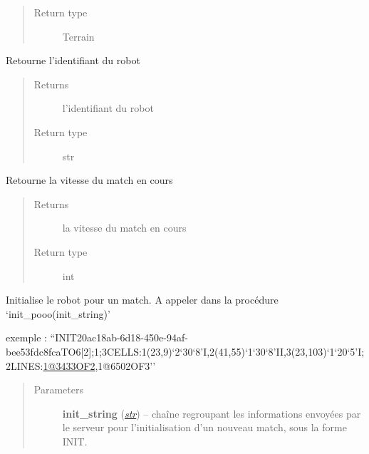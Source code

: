 \documentclass[letterpaper,10pt,english]{sphinxmanual}
\begin{document}
\begin{fulllineitems}
\begin{fulllineitems}
\begin{quote}
\begin{description}
\item[{Return type}] \leavevmode
Terrain

\end{description}\end{quote}

\end{fulllineitems}


\begin{fulllineitems}
\label{index:Robot.Robot.getUID}
Retourne l'identifiant du robot
\begin{quote}\begin{description}
\item[{Returns}] \leavevmode
l'identifiant du robot

\item[{Return type}] \leavevmode
str

\end{description}\end{quote}

\end{fulllineitems}


\begin{fulllineitems}
\label{index:Robot.Robot.getVitesse}
Retourne la vitesse du match en cours
\begin{quote}\begin{description}
\item[{Returns}] \leavevmode
la vitesse du match en cours

\item[{Return type}] \leavevmode
int

\end{description}\end{quote}

\end{fulllineitems}


\begin{fulllineitems}
\label{index:Robot.Robot.initialiserMatch}
Initialise le robot pour un match.
A appeler dans la procédure `init\_pooo(init\_string)'

exemple : ``INIT20ac18ab-6d18-450e-94af-bee53fdc8fcaTO6{[}2{]};1;3CELLS:1(23,9)`2`30`8'I,2(41,55)`1`30`8'II,3(23,103)`1`20`5'I;2LINES:\href{mailto:1@3433OF2}{1@3433OF2},1@6502OF3''
\begin{quote}\begin{description}
\item[{Parameters}] \leavevmode
\textbf{init\_string} (\href{http://docs.python.org/library/functions.html\#str}{\emph{str}}) -- chaîne regroupant les informations envoyées par le serveur pour l'initialisation d'un nouveau match, sous la forme INIT.


\end{description}
\end{quote}
\end{fulllineitems}
\end{fulllineitems}
\end{document}
